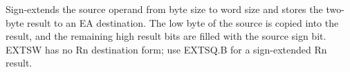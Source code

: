 Sign-extends the source operand from byte size to word size and stores the two-byte result to an EA destination. The low byte of the source is copied into the result, and the remaining high result bits are filled with the source sign bit. EXTSW has no Rn destination form; use EXTSQ.B for a sign-extended Rn result.

